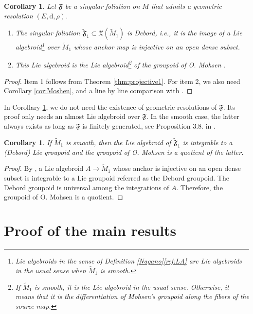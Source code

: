 \documentclass[10pt]{article}
\theoremstyle{plain}
\newtheorem{corollary}[lemma]{Corollary}
\theoremstyle{definition}
\theoremstyle{remark}
\newcommand{\dd}{\mathrm{d}}
\begin{document}
\begin{corollary}\label{thm:projective}Let $\mathfrak F$ be a singular foliation on $M$ that admits a geometric resolution $(E,\dd, \rho)$. 

\begin{enumerate}
    \item The singular foliation 
$\widetilde{\mathfrak{F}}_1\subset \mathfrak X(\widetilde M_1)$ is Debord, i.e., it is the image of a Lie algebroid\footnote{Lie algebroids in the sense of Definition \ref{Nagano}\eqref{ref:LA} are Lie algebroids in the usual sense when $\widetilde M_1$ is smooth.} over $\widetilde M_1$ whose anchor map is injective on an open dense subset. \item This Lie algebroid is the Lie algebroid\footnote{If $\widetilde M_1$ is smooth, it is the Lie algebroid in the usual sense. Otherwise, it means that it is the differentiation of Mohsen's groupoid along the fibers of the source map.} of the groupoid of O. Mohsen \cite{MohsenOmar}.
\end{enumerate}
\end{corollary}

\begin{proof}
    Item 1 follows from Theorem \ref{thm:projective1}. For item 2, we also need Corollary \ref{cor:Moshen}, and a line by line comparison with \cite{MohsenOmar}. 
\end{proof}

In Corollary  \ref{thm:projective}, we do not need  the existence of geometric resolutions of $\mathfrak F$. Its proof only needs an almost Lie algebroid over $\mathfrak F$. In the smooth case, the latter always exists as long as $\mathfrak F$ is finitely generated, see Proposition 3.8. in \cite{LLS}. 

\begin{corollary}
    If $\widetilde M_1$ is smooth, then the Lie algebroid of $\widetilde {\mathfrak F}_1$ is integrable to a (Debord) Lie groupoid and the groupoid of O. Mohsen is a quotient of the latter.
\end{corollary}
\begin{proof}
    By \cite{Debord}, a Lie algebroid $A\to \widetilde M_1$ whose anchor is injective on an open dense subset is integrable to a Lie groupoid referred as the Debord groupoid. The Debord groupoid is universal among the integrations of $A$. Therefore, the groupoid of O. Mohsen is a quotient.
\end{proof}


\section{Proof of the main results}\label{sec:Proofs}
\end{document}
